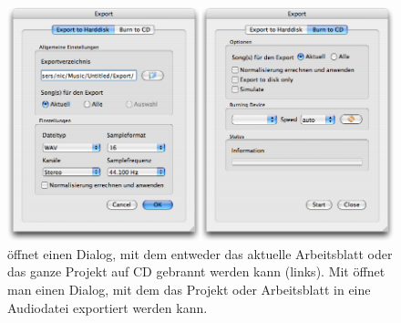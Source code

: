 \begin{figure}[t]
 \centering\includegraphics[width=\textwidth]{images/exportdlg}
 \caption{ öffnet einen Dialog, mit dem entweder das aktuelle Arbeitsblatt oder das ganze Projekt auf CD gebrannt werden kann (links). Mit  öffnet man einen Dialog, mit dem das Projekt oder Arbeitsblatt in eine Audiodatei exportiert werden kann.}
 \label{fig_exportdlg}
\end{figure}

